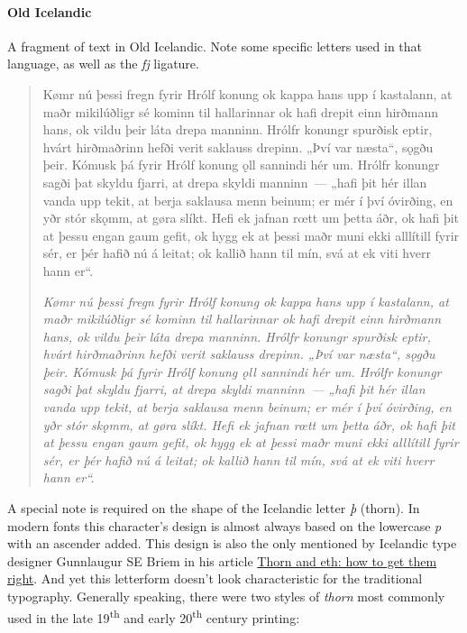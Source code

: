 \documentclass[12pt,a4paper,openany]{book}
\begin{document}
\paragraph{Old Icelandic}

A fragment of text in Old Icelandic. Note some specific letters used in
that language, as well as the \textit{fj} ligature.

\begin{quote}
\large

Kømr nú þessi fregn fyrir Hrólf konung ok kappa hans upp í kastalann, at
maðr mikilúðligr sé kominn til hallarinnar ok hafi drepit einn hirðmann
hans, ok vildu þeir láta drepa manninn. Hrólfr konungr spurðisk eptir,
hvárt hirðmaðrinn hefði verit saklauss drepinn. „Því var næsta“, sǫgðu
þeir. Kómusk þá fyrir Hrólf konung ǫll sannindi hér um. Hrólfr konungr
sagði þat skyldu fjarri, at drepa skyldi manninn~— „hafi þit hér illan
vanda upp tekit, at berja saklausa menn beinum; er mér í því óvirðing, en
yðr stór skǫmm, at gøra slíkt. Hefi ek jafnan rœtt um þetta áðr, ok hafi
þit at þessu engan gaum gefit, ok hygg ek at þessi maðr muni ekki alllítill
fyrir sér, er þér hafið nú á leitat; ok kallið hann til mín, svá at ek viti
hverr hann er“.

\smallskip

\itshape
Kømr nú þessi fregn fyrir Hrólf konung ok kappa hans upp í kastalann, at
maðr mikilúðligr sé kominn til hallarinnar ok hafi drepit einn hirðmann
hans, ok vildu þeir láta drepa manninn. Hrólfr konungr spurðisk eptir,
hvárt hirðmaðrinn hefði verit saklauss drepinn. „Því var næsta“, sǫgðu
þeir. Kómusk þá fyrir Hrólf konung ǫll sannindi hér um. Hrólfr konungr
sagði þat skyldu fjarri, at drepa skyldi manninn~— „hafi þit hér illan
vanda upp tekit, at berja saklausa menn beinum; er mér í því óvirðing, en
yðr stór skǫmm, at gøra slíkt. Hefi ek jafnan rœtt um þetta áðr, ok hafi
þit at þessu engan gaum gefit, ok hygg ek at þessi maðr muni ekki alllítill
fyrir sér, er þér hafið nú á leitat; ok kallið hann til mín, svá at ek viti
hverr hann er“.

\end{quote}

A special note is required on the shape of the Icelandic letter \textit{þ}
(thorn). In modern fonts this character’s design is almost always based on
the lowercase \textit{p} with an ascender added. This design is also the
only mentioned by Icelandic type designer Gunnlaugur SE Briem in his
article \href{http://66.147.242.192/~operinan/2/2.11/index.htm}{Thorn and eth: how
to get them right}. And yet this letterform doesn’t look characteristic for
the traditional typography. Generally speaking, there were two styles of
\textit{thorn} most commonly used in the late 19\textsuperscript{th} and
early 20\textsuperscript{th} century printing:
\end{document}

